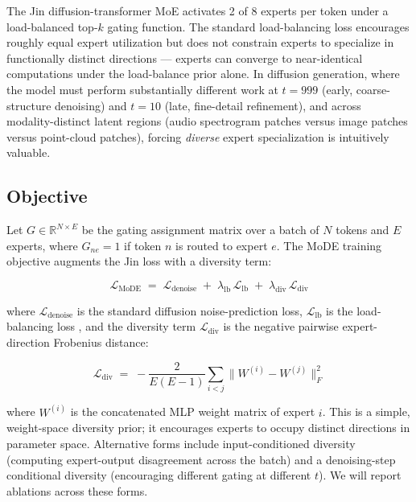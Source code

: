 \documentclass[11pt,a4paper]{article}
\begin{document}
The Jin diffusion-transformer MoE \cite{jin} activates 2 of 8 experts per token under a load-balanced
top-$k$ gating function. The standard load-balancing loss \cite{switch} encourages roughly equal
expert utilization but does not constrain experts to specialize in functionally distinct directions
--- experts can converge to near-identical computations under the load-balance prior alone. In
diffusion generation, where the model must perform substantially different work at $t=999$ (early,
coarse-structure denoising) and $t=10$ (late, fine-detail refinement), and across modality-distinct
latent regions (audio spectrogram patches versus image patches versus point-cloud patches), forcing
\emph{diverse} expert specialization is intuitively valuable.

\subsection{Objective}

Let $G \in \mathbb{R}^{N \times E}$ be the gating assignment matrix over a batch of $N$ tokens and
$E$ experts, where $G_{ne} = 1$ if token $n$ is routed to expert $e$. The MoDE training objective
augments the Jin loss with a diversity term:

\begin{equation}
\mathcal{L}_\text{MoDE} \;=\; \mathcal{L}_\text{denoise} \;+\; \lambda_\text{lb}\, \mathcal{L}_\text{lb} \;+\;
\lambda_\text{div}\, \mathcal{L}_\text{div}
\end{equation}

\noindent where $\mathcal{L}_\text{denoise}$ is the standard diffusion noise-prediction loss,
$\mathcal{L}_\text{lb}$ is the load-balancing loss \cite{switch}, and the diversity term
$\mathcal{L}_\text{div}$ is the negative pairwise expert-direction Frobenius distance:

\begin{equation}
\mathcal{L}_\text{div} \;=\; -\frac{2}{E(E-1)} \sum_{i < j} \big\| W^{(i)} - W^{(j)} \big\|_F^2
\end{equation}

\noindent where $W^{(i)}$ is the concatenated MLP weight matrix of expert $i$. This is a simple,
weight-space diversity prior; it encourages experts to occupy distinct directions in parameter space.
Alternative forms include input-conditioned diversity (computing expert-output disagreement across
the batch) and a denoising-step conditional diversity (encouraging different gating at different
$t$). We will report ablations across these forms.
\end{document}
